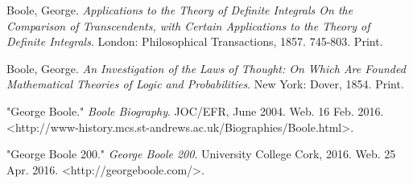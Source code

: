 \documentclass[12]{article} %
\begin{document}
\newpage

\begin{thebibliography}{9}
Boole, George. 
\textit{Applications to the Theory of Definite Integrals On the Comparison of Transcendents, with Certain Applications to the Theory of Definite Integrals}. 
London: Philosophical Transactions, 1857. 745-803. Print.
 
Boole, George. 
\textit{An Investigation of the Laws of Thought: On Which Are Founded Mathematical Theories of Logic and Probabilities}.
New York: Dover, 1854. Print.
 
"George Boole."
\textit{Boole Biography}.
JOC/EFR, June 2004. Web. 16 Feb. 2016. \textless http://www-history.mcs.st-andrews.ac.uk/Biographies/Boole.html\textgreater.

"George Boole 200."
\textit{George Boole 200}.
University College Cork, 2016. Web. 25 Apr. 2016. \textless http://georgeboole.com/\textgreater.
\end{thebibliography}
\end{document}
